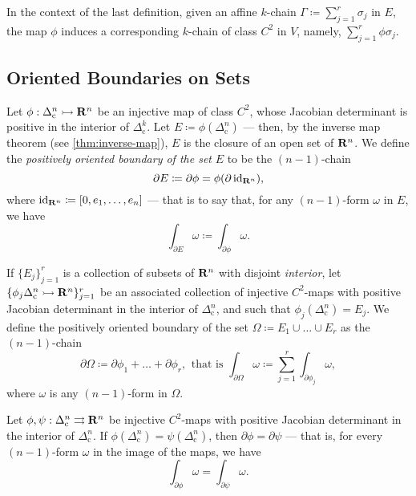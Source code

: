 In the context of the last definition, given an affine \(k\)-chain \(\Gamma
\coloneq \sum_{j=1}^r \sigma_j\) in \(E\), the map \(\phi\) induces a
corresponding \(k\)-chain of class \(C^2\) in \(V\), namely, \(\sum_{j=1}^r \phi
\sigma_j\).

\subsection{Oriented Boundaries on Sets}

\begin{definition}
\label{def:positively-oriented-boundary-on-sets}
Let \(\phi: \Delta_{\text{c}}^n \rightarrowtail \mathbf{R}^n\) be an injective map of class
\(C^2\), whose Jacobian determinant is positive in the interior of
\(\Delta_{\text{c}}^k\). Let \(E \coloneq \phi(\Delta_{\text{c}}^n)\) --- then,
by the inverse map theorem (see \cref{thm:inverse-map}), \(E\) is the closure of
an open set of \(\mathbf{R}^n\). We define the \emph{positively oriented boundary of
  the set} \(E\) to be the \((n-1)\)-chain
\[
  \partial E \coloneq \partial \phi = \phi(\partial \operatorname{id}_{\mathbf{R}^n}),
\]
where \(\operatorname{id}_{\mathbf{R}^n} \coloneq [0, e_1, \dots, e_n]\) --- that is to say that, for
any \((n-1)\)-form \(\omega\) in \(E\), we have
\[
  \int_{\partial E} \omega \coloneq \int_{\partial \phi} \omega.
\]

If \(\{E_{j}\}_{j=1}^r\) is a collection of subsets of \(\mathbf{R}^n\) with disjoint
\emph{interior}, let
\(\{\phi_{j} \relax \Delta_{\text{c}}^n \rightarrowtail \mathbf{R}^n\}_{j=1}^r\) be an associated
collection of injective \(C^2\)-maps with positive Jacobian determinant in the
interior of \(\Delta_{\text{c}}^n\), and such that
\(\phi_j(\Delta_{\text{c}}^n) = E_j\). We define the positively oriented
boundary of the set \(\Omega \coloneq E_1 \cup \dots \cup E_r\) as the
\((n-1)\)-chain
\[
  \partial \Omega \coloneq \partial \phi_1 + \dots + \partial \phi_{r}
  \text{,}\ \text{ that is }
  \int_{\partial \Omega} \omega \coloneq \sum_{j=1}^r \int_{\partial \phi_j} \omega,
\]
where \(\omega\) is any \((n-1)\)-form in \(\Omega\).
\end{definition}

\begin{proposition}
\label{prop:same-boundary-same-integral-over-form}
Let \(\phi, \psi: \Delta_{\text{c}}^n \rightrightarrows \mathbf{R}^n\) be injective
\(C^2\)-maps with positive Jacobian determinant in the interior of
\(\Delta_{\text{c}}^n\). If \(\phi(\Delta_{\text{c}}^n) =
\psi(\Delta_{\text{c}}^n)\), then \(\partial \phi = \partial \psi\) --- that is,
for every \((n-1)\)-form \(\omega\) in the image of the maps, we have
\[
  \int_{\partial \phi} \omega = \int_{\partial \psi} \omega.
\]
\end{proposition}

